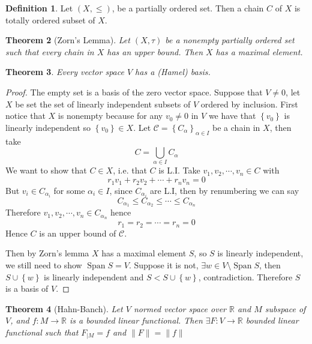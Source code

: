 \documentclass[11pt,a4paper]{article}
\theoremstyle{definition}
\newtheorem{definition}{Definition}[section]
\theoremstyle{plain}
\newtheorem{theorem}[definition]{Theorem}
\theoremstyle{remark}
\newcommand{\R}{\mathbb{R}}
\renewcommand{\set}[1]{\left\{ #1 \right\}}
\newcommand{\norm}[1]{\lVert #1 \rVert}
\newcommand{\1}{\mathbbm{1}}
\newcommand{\Span}{\operatorname{Span}}
\begin{document}
\begin{definition}
    Let $(X, \le)$, be a partially ordered set. Then a chain $C$ of $X$ is totally ordered subset of $X$.
\end{definition}

\begin{theorem}[Zorn's Lemma]
    Let $(X, \tau)$ be a nonempty partially ordered set such that  every chain in $X$ has an upper bound. Then $X$ has a maximal element. 
\end{theorem}

\begin{theorem}
    Every vector space $V$ has a (Hamel) basis.
\end{theorem}

\begin{proof}
    The empty set is a basis of the zero vector space. 
    Suppose that $V \ne 0$, let $X$ be set the set of linearly independent subsets of $V$ ordered by inclusion. First notice that $X$ is nonempty 
    because for any $v_0 \ne 0$ in $V$ we have that $\set{v_0}$ is linearly independent so $\set{v_0} \in X$. 
    Let $\mathcal{C} = \set{C_\alpha}_{\alpha \in I}$ be a chain in $X$, then take 
    $$C = \bigcup_{\alpha \in I} C_\alpha$$
    We want to show that $C \in X$, i.e. that $C$ is L.I. Take $v_1, v_2, \cdots, v_n \in C$ with 
    $$r_1 v_1 + r_2 v_2 + \cdots + r_n v_n = 0$$
    But $v_i \in C_{\alpha_i}$ for some $\alpha_i \in I$, since $C_{\alpha_i}$ are L.I, then by renumbering we can say 
    $$C_{\alpha_1} \le C_{\alpha_2} \le \cdots \le C_{\alpha_n}$$
    Therefore $v_1, v_2, \cdots, v_n \in C_{\alpha_n}$ hence 
    $$r_1 = r_2 = \cdots = r_n = 0$$
    Hence $C$ is an upper bound of $\mathcal{C}$. 

    Then by Zorn's lemma $X$ has a maximal element $S$, so $S$ is linearly independent, we still need to show $\Span S = V$. Suppose it is not, $\exists w \in V \setminus \Span S$, 
    then $S \cup \set{w}$ is linearly independent and $S < S \cup \set{w}$, contradiction. Therefore $S$ is a basis of $V$.  
\end{proof}

\begin{theorem}[Hahn-Banch]
    Let $V$ normed vector space over $\R$ and $M$ subspace of $V$, and $f \colon M \to \R$ is a bounded linear functional. Then $\exists F \colon V \to \R$ bounded linear functional 
    such that $F_{|M} = f$ and $\norm{F} = \norm{f}$
\end{theorem}
\end{document}
